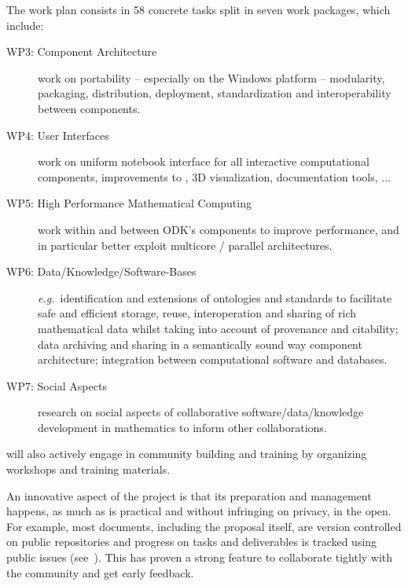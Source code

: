 The \ODK work plan consists in 58 concrete tasks split in seven work packages, which
include:
\begin{description}
\item[WP3: Component Architecture] work on portability -- especially
  on the Windows platform -- modularity, packaging, distribution,
  deployment, standardization and interoperability between components.
\item[WP4: User Interfaces] work on uniform \Jupyter notebook
  interface for all interactive computational components, improvements
  to \Jupyter, 3D visualization, documentation tools, ...
\item[WP5: High Performance Mathematical Computing] work within
  and between ODK's components to improve performance, and in
  particular better exploit multicore / parallel architectures.
\item[WP6: Data/Knowledge/Software-Bases] \emph{e.g.}\ identification and extensions of ontologies
  and standards to facilitate safe and efficient storage, reuse, interoperation and
  sharing of rich mathematical data whilst taking into account of provenance and
  citability; data archiving and sharing in a semantically sound way component
  architecture; integration between computational software and databases.
\item[WP7: Social Aspects] research on social aspects of collaborative
  software/data/knowledge development in mathematics to inform other collaborations.
\end{description}
\ODK will also actively engage in community building and training by organizing workshops
and training materials.

An innovative aspect of the \ODK project is that its preparation and management happens,
as much as is practical and without infringing on privacy, in the open. For example, most
documents, including the proposal itself, are version controlled on public repositories
and progress on tasks and deliverables is tracked using public issues
(see~\cite{OpenDreamKit:on}). This has proven a strong feature to collaborate tightly with
the community and get early feedback.


